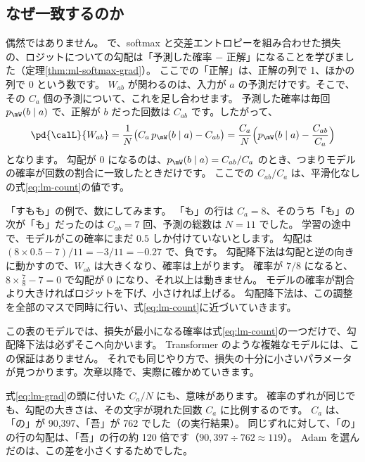 \subsection*{なぜ一致するのか}

偶然ではありません。
で、softmax と交差エントロピーを組み合わせた損失の、ロジットについての勾配は「予測した確率 $-$ 正解」になることを学びました（定理\ref{thm:ml-softmax-grad}）。
ここでの「正解」は、正解の列で 1、ほかの列で 0 という数です。
$W_{ab}$ が関わるのは、入力が $a$ の予測だけです。そこで、その $C_a$ 個の予測について、これを足し合わせます。
予測した確率は毎回 $p_{\mW}(b\mid a)$ で、正解が $b$ だった回数は $C_{ab}$ です。したがって、
\begin{equation}
\pd{\calL}{W_{ab}}=\frac{1}{N}\bigl(C_a\,p_{\mW}(b\mid a)-C_{ab}\bigr)
=\frac{C_a}{N}\Bigl(p_{\mW}(b\mid a)-\frac{C_{ab}}{C_a}\Bigr)
\label{eq:lm-grad}
\end{equation}
となります。
勾配が 0 になるのは、$p_{\mW}(b\mid a)=C_{ab}/C_a$ のとき、つまりモデルの確率が回数の割合に一致したときだけです。
ここでの $C_{ab}/C_a$ は、平滑化なしの式\eqref{eq:lm-count}の値です。

「すもも」の例で、数にしてみます。
「も」の行は $C_a=8$、そのうち「も」の次が「も」だったのは $C_{ab}=7$ 回、予測の総数は $N=11$ でした。
学習の途中で、モデルがこの確率にまだ $0.5$ しか付けていないとします。
勾配は $(8\times0.5-7)/11=-3/11=-0.27$ で、負です。
勾配降下法は勾配と逆の向きに動かすので、$W_{ab}$ は大きくなり、確率は上がります。
確率が $7/8$ になると、$8\times\frac{7}{8}-7=0$ で勾配が 0 になり、それ以上は動きません。
モデルの確率が割合より大きければロジットを下げ、小さければ上げる。
勾配降下法は、この調整を全部のマスで同時に行い、式\eqref{eq:lm-count}に近づいていきます。

この表のモデルでは、損失が最小になる確率は式\eqref{eq:lm-count}の一つだけで、勾配降下法は必ずそこへ向かいます。
Transformer のような複雑なモデルには、この保証はありません。
それでも同じやり方で、損失の十分に小さいパラメータが見つかります。次章以降で、実際に確かめていきます。

式\eqref{eq:lm-grad}の頭に付いた $C_a/N$ にも、意味があります。
確率のずれが同じでも、勾配の大きさは、その文字が現れた回数 $C_a$ に比例するのです。
$C_a$ は、「の」が 90,397、「吾」が 762 でした（の実行結果）。
同じずれに対して、「の」の行の勾配は、「吾」の行の約 120 倍です（$90{,}397\div762\approx119$）。
Adam を選んだのは、この差を小さくするためでした。

